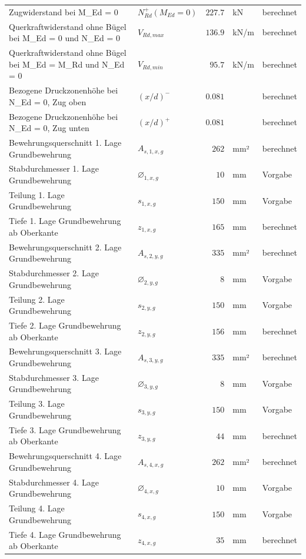 \documentclass[11pt,a4paper]{article}
\begin{document}
\begin{xltabular}{\linewidth}{>{\raggedright\arraybackslash}Xlrll}
Zugwiderstand bei M\_Ed = 0 & $N_{Rd}^{+}(M_{Ed} = 0)$ & $227.7$ & kN & berechnet \\
Querkraftwiderstand ohne Bügel bei M\_Ed = 0 und N\_Ed = 0 & $V_{Rd,max}$ & $136.9$ & kN/m & berechnet \\
Querkraftwiderstand ohne Bügel bei M\_Ed = M\_Rd und N\_Ed = 0 & $V_{Rd,min}$ & $95.7$ & kN/m & berechnet \\
Bezogene Druckzonenhöhe bei N\_Ed = 0, Zug oben & $\left(x/d\right)^{-}$ & $0.081$ &  & berechnet \\
Bezogene Druckzonenhöhe bei N\_Ed = 0, Zug unten & $\left(x/d\right)^{+}$ & $0.081$ &  & berechnet \\
Bewehrungsquerschnitt 1. Lage Grundbewehrung & $A_{s,1,x,g}$ & $262$ & mm² & berechnet \\
Stabdurchmesser 1. Lage Grundbewehrung & $\varnothing_{1,x,g}$ & $10$ & mm & Vorgabe \\
Teilung 1. Lage Grundbewehrung & $s_{1,x,g}$ & $150$ & mm & Vorgabe \\
Tiefe 1. Lage Grundbewehrung ab Oberkante & $z_{1,x,g}$ & $165$ & mm & berechnet \\
Bewehrungsquerschnitt 2. Lage Grundbewehrung & $A_{s,2,y,g}$ & $335$ & mm² & berechnet \\
Stabdurchmesser 2. Lage Grundbewehrung & $\varnothing_{2,y,g}$ & $8$ & mm & Vorgabe \\
Teilung 2. Lage Grundbewehrung & $s_{2,y,g}$ & $150$ & mm & Vorgabe \\
Tiefe 2. Lage Grundbewehrung ab Oberkante & $z_{2,y,g}$ & $156$ & mm & berechnet \\
Bewehrungsquerschnitt 3. Lage Grundbewehrung & $A_{s,3,y,g}$ & $335$ & mm² & berechnet \\
Stabdurchmesser 3. Lage Grundbewehrung & $\varnothing_{3,y,g}$ & $8$ & mm & Vorgabe \\
Teilung 3. Lage Grundbewehrung & $s_{3,y,g}$ & $150$ & mm & Vorgabe \\
Tiefe 3. Lage Grundbewehrung ab Oberkante & $z_{3,y,g}$ & $44$ & mm & berechnet \\
Bewehrungsquerschnitt 4. Lage Grundbewehrung & $A_{s,4,x,g}$ & $262$ & mm² & berechnet \\
Stabdurchmesser 4. Lage Grundbewehrung & $\varnothing_{4,x,g}$ & $10$ & mm & Vorgabe \\
Teilung 4. Lage Grundbewehrung & $s_{4,x,g}$ & $150$ & mm & Vorgabe \\
Tiefe 4. Lage Grundbewehrung ab Oberkante & $z_{4,x,g}$ & $35$ & mm & berechnet \\

\end{xltabular}
\end{document}
